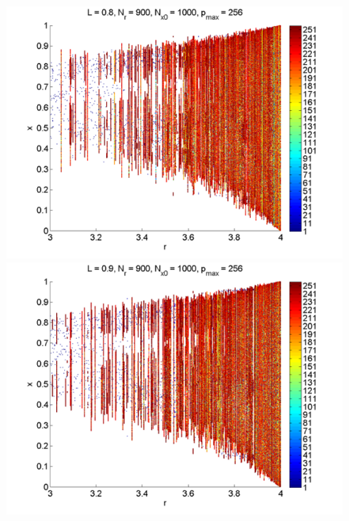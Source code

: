 \begin{figure}[H]
\begin{center}
		\includegraphics[width=.5\textwidth]{figs/rlog_bif_zoom_L_08.png}\hfill
		\includegraphics[width=.5\textwidth]{figs/rlog_bif_zoom_L_09.png}\\
	\end{center}
\end{figure}

